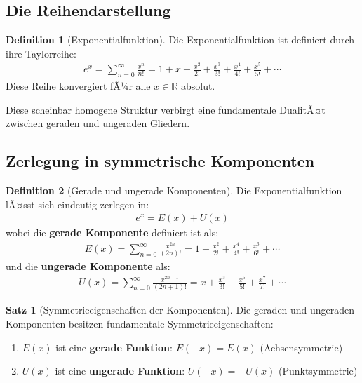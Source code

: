 ﻿\documentclass[a4paper,12pt]{article}
\theoremstyle{definition}
\newtheorem{definition}{Definition}
\newtheorem{satz}{Satz}
\begin{document}
\subsection{Die Reihendarstellung}

\begin{definition}[Exponentialfunktion]
Die Exponentialfunktion ist definiert durch ihre Taylorreihe:
\begin{align}
  e^x = \sum_{n=0}^{\infty} \frac{x^n}{n!}
      = 1 + x + \frac{x^2}{2!} + \frac{x^3}{3!} + \frac{x^4}{4!}
        + \frac{x^5}{5!} + \cdots
\end{align}
Diese Reihe konvergiert fÃ¼r alle $x \in \mathbb{R}$ absolut.
\end{definition}

Diese scheinbar homogene Struktur verbirgt eine fundamentale DualitÃ¤t zwischen
geraden und ungeraden Gliedern.

\subsection{Zerlegung in symmetrische Komponenten}

\begin{definition}[Gerade und ungerade Komponenten]
Die Exponentialfunktion lÃ¤sst sich eindeutig zerlegen in:
\begin{align}
  e^x = E(x) + U(x)
\end{align}
wobei die \textbf{gerade Komponente} definiert ist als:
\begin{align}
  E(x) = \sum_{n=0}^{\infty} \frac{x^{2n}}{(2n)!}
       = 1 + \frac{x^2}{2!} + \frac{x^4}{4!} + \frac{x^6}{6!} + \cdots
\end{align}
und die \textbf{ungerade Komponente} als:
\begin{align}
  U(x) = \sum_{n=0}^{\infty} \frac{x^{2n+1}}{(2n+1)!}
       = x + \frac{x^3}{3!} + \frac{x^5}{5!} + \frac{x^7}{7!} + \cdots
\end{align}
\end{definition}

\begin{satz}[Symmetrieeigenschaften der Komponenten]
Die geraden und ungeraden Komponenten besitzen fundamentale
Symmetrieeigenschaften:
\begin{enumerate}
  \item $E(x)$ ist eine \textbf{gerade Funktion}: $E(-x) = E(x)$
        (Achsensymmetrie)
  \item $U(x)$ ist eine \textbf{ungerade Funktion}: $U(-x) = -U(x)$
        (Punktsymmetrie)
\end{enumerate}
\end{satz}
\end{document}
